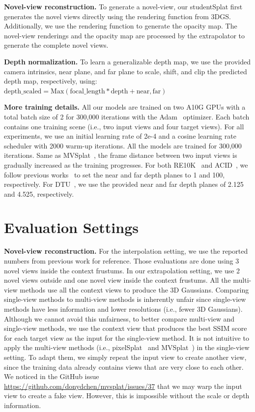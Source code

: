 \documentclass{article} %
\begin{document}
\textbf{Novel-view reconstruction.} To generate a novel-view, our studentSplat first generates the novel views directly using the rendering function from 3DGS. Additionally, we use the rendering function to generate the opacity map. The novel-view renderings and the opacity map are processed by the extrapolator to generate the complete novel views.

\textbf{Depth normalization.} To learn a generalizable depth map, we use the provided camera intrinsics, near plane, and far plane to scale, shift, and clip the predicted depth map, respectively, using: $\mathrm{depth\_scaled}=\mathrm{Max}(\mathrm{focal\_length}*\mathrm{depth}+\mathrm{near},\mathrm{far})$

\textbf{More training details.} All our models are trained on two A10G GPUs with a total batch size of 2 for 300,000 iterations with the Adam~\citep{kingma2014adam} optimizer. Each batch contains one training scene (i.e., two input views and four target views).  For all experiments, we use an initial learning rate of 2e-4 and a cosine learning rate scheduler with 2000 warm-up iterations. All the models are trained for 300,000 iterations. Same as MVSplat~\citep{chen2024mvsplat}, the frame distance between two input views is gradually increased as the training progresses. For both RE10K~\citep{zhou2018stereo} and ACID~\citep{liu2021infinite}, we follow previous works~\citep{charatan2024pixelsplat,chen2024mvsplat} to set the near and far depth planes to 1 and 100, respectively. For DTU~\citep{aanaes2016large}, we use the provided near and far depth planes of 2.125 and 4.525, respectively.

\section{Evaluation Settings}
\label{sec:add_eval_setting}

\textbf{Novel-view reconstruction.} For the interpolation setting, we use the reported numbers from previous work for reference. Those evaluations are done using 3 novel views inside the context frustums. In our extrapolation setting, we use 2 novel views outside and one novel view inside the context frustums. All the multi-view methods use all the context views to produce the 3D Gaussians. Comparing single-view methods to multi-view methods is inherently unfair since single-view methods have less information and lower resolutions (i.e., fewer 3D Gaussians). Although we cannot avoid this unfairness, to better compare multi-view and single-view methods, we use the context view that produces the best SSIM score for each target view as the input for the single-view method. It is not intuitive to apply the multi-view methods (i.e., pixelSplat~\citep{charatan2024pixelsplat} and MVSplat~\citep{chen2024mvsplat}) in the single-view setting. To adapt them, we simply repeat the input view to create another view, since the training data already contains views that are very close to each other. We noticed in the GitHub issue \url{https://github.com/donydchen/mvsplat/issues/37} that we may warp the input view to create a fake view. However, this is impossible without the scale or depth information.
\end{document}
